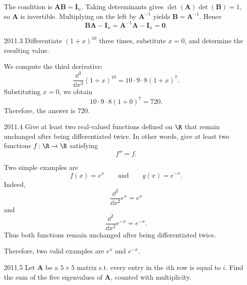     \begin{solution}
The condition is $\mathbf{A}\mathbf{B}=\mathbf{I}_n$. Taking determinants gives
        $\det(\mathbf{A})\det(\mathbf{B})=1$, so $\mathbf{A}$ is invertible.
        Multiplying on the left by $\mathbf{A}^{-1}$ yields
        $\mathbf{B}=\mathbf{A}^{-1}$. Hence
        \[
            \mathbf{B}\mathbf{A}-\mathbf{I}_n
            =\mathbf{A}^{-1}\mathbf{A}-\mathbf{I}_n
            =\boxed{\mathbf{0}}.
        \]
    \end{solution}

    \begin{pastproblem}{2011.3}
        Differentiate $(1+x)^{10}$ three times, substitute $x=0$, and determine the resulting value.
    \end{pastproblem}

    \begin{solution}
        We compute the third derivative:
        \[
            \frac{\dd^3}{\dd x^3}(1+x)^{10}
            =
            10\cdot 9\cdot 8(1+x)^7.
        \]
        Substituting $x=0$, we obtain
        \[
            10\cdot 9\cdot 8(1+0)^7
            =
            720.
        \]
        Therefore, the answer is $\boxed{720}$.
    \end{solution}

    \begin{pastproblem}{2011.4}
        Give at least two real-valued functions defined on $\R$ that remain unchanged after being
        differentiated twice. In other words, give at least two functions $f\colon\R\to\R$ satisfying
        \[
            f''=f.
        \]
    \end{pastproblem}

    \begin{solution}
        Two simple examples are
        \[
            f(x)=e^x
            \qquad\text{and}\qquad
            g(x)=e^{-x}.
        \]
        Indeed,
        \[
            \frac{\dd^2}{\dd x^2}e^x=e^x
        \]
        and
        \[
            \frac{\dd^2}{\dd x^2}e^{-x}=e^{-x}.
        \]
        Thus both functions remain unchanged after being differentiated twice.

        Therefore, two valid examples are $\boxed{e^x\text{ and }e^{-x}}$.
    \end{solution}

    \begin{pastproblem}{2011.5}
        Let $\mathbf{A}$ be a $5\times 5$ matrix s.t. every entry in the $i$th row is equal to
        $i$. Find the sum of the five eigenvalues of $\mathbf{A}$, counted with multiplicity.
    \end{pastproblem}

